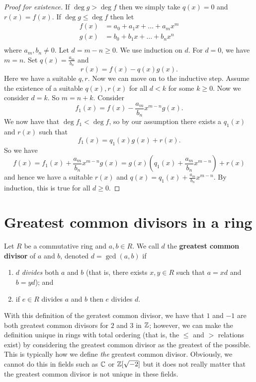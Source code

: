 
\begin{proof}[Proof for existence]
    If $\deg{g} > \deg{f}$ then we simply take $q(x) = 0$ and $r(x) = f(x)$. If $\deg{g} \leq \deg{f}$ then let 
    \begin{align*}
        f(x) &= a_0 + a_1x + \ldots + a_mx^m \\
        g(x) &= b_0 + b_1x + \ldots + b_nx^n \\
    \end{align*}
    where $a_m, b_n \neq 0$. Let $d = m - n \geq 0$. We use induction on $d$. For $d = 0$, we have $m = n$. Set $q(x) = \frac{a_m}{b_n}$ and
    \[ r(x) = f(x) - q(x)g(x). \]
    Here we have a suitable $q, r$. Now we can move on to the inductive step. Assume the existence of a suitable $q(x), r(x)$ for all $d < k$ for some $k \geq 0$. Now we consider $d = k$. So $m = n + k$. Consider
    \[ f_1(x) = f(x) - \frac{a_m}{b_n} x^{m - n} g(x). \]
    We now have that $\deg{f_1} < \deg{f}$, so by our assumption there exists a $q_1(x)$ and $r(x)$ such that
    \[ f_1(x) = q_1(x)g(x) + r(x). \]
    So we have
    \[ f(x) = f_1(x) + \frac{a_m}{b_n} x^{m - n}g(x) = g(x) \left(q_1(x) + \frac{a_m}{b_n} x^{m - n}\right) + r(x) \] and hence we have a suitable $r(x)$ and $q(x) = q_1(x) + \frac{a_m}{b_n}x^{m - n}$. By induction, this is true for all $d \geq 0$.
\end{proof}

\chapter{Greatest common divisors in a ring}

\begin{definition}
    Let $R$ be a commutative ring and $a, b \in R$. We call $d$ the \textbf{greatest common divisor} of $a$ and $b$, denoted $d = \gcd{(a, b)}$ if
    \begin{enumerate}
        \item $d$ \emph{divides} both $a$ and $b$ (that is, there exists $x, y \in R$ such that $a = xd$ and $b = yd$); and
        \item if $e \in R$ divides $a$ and $b$ then $e$ divides $d$.
    \end{enumerate}
\end{definition}

\begin{example}
    With this definition of the geratest common divisor, we have that $1$ and $-1$ are both greatest common divisors for $2$ and $3$ in $\mathbb{Z}$; however, we can make the definition unique in rings with total ordering (that is, the $\leq$ and $>$ relations exist) by considering the greatest common divisor as the greatest of the possible. This is typically how we define \emph{the} greatest common divisor. Obviously, we cannot do this in fields such as $\mathbb{C}$ or $\mathbb{Z}[\sqrt{-2}]$ but it does not really matter that the greatest common divisor is not unique in these fields.
\end{example}

